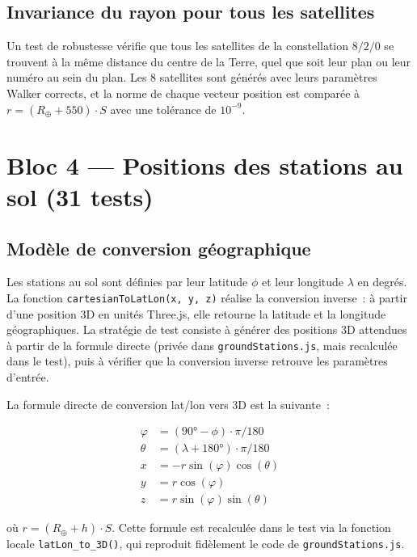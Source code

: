 \documentclass[12pt,a4paper]{article}
\begin{document}
\subsection{Invariance du rayon pour tous les satellites}

Un test de robustesse vérifie que tous les satellites de la constellation $8/2/0$ se trouvent à la même distance du centre de la Terre, quel que soit leur plan ou leur numéro au sein du plan. Les 8 satellites sont générés avec leurs paramètres Walker corrects, et la norme de chaque vecteur position est comparée à $r = (R_\oplus + 550) \cdot S$ avec une tolérance de $10^{-9}$.

\section{Bloc 4 — Positions des stations au sol (31 tests)}

\subsection{Modèle de conversion géographique}

Les stations au sol sont définies par leur latitude $\phi$ et leur longitude $\lambda$ en degrés. La fonction \texttt{cartesianToLatLon(x, y, z)} réalise la conversion inverse~: à partir d'une position 3D en unités Three.js, elle retourne la latitude et la longitude géographiques. La stratégie de test consiste à générer des positions 3D attendues à partir de la formule directe (privée dans \texttt{groundStations.js}, mais recalculée dans le test), puis à vérifier que la conversion inverse retrouve les paramètres d'entrée.

La formule directe de conversion lat/lon vers 3D est la suivante~:

\begin{align}
    \varphi &= (90° - \phi) \cdot \pi/180 \\
    \theta &= (\lambda + 180°) \cdot \pi/180 \\
    x &= -r \sin(\varphi)\cos(\theta) \\
    y &= r \cos(\varphi) \\
    z &= r \sin(\varphi)\sin(\theta)
\end{align}

où $r = (R_\oplus + h) \cdot S$. Cette formule est recalculée dans le test via la fonction locale \texttt{latLon\_to\_3D()}, qui reproduit fidèlement le code de \texttt{groundStations.js}.
\end{document}
